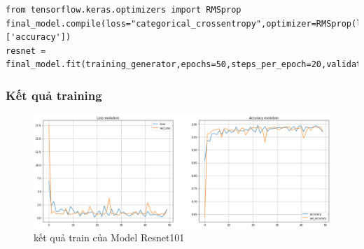 \begin{lstlisting}
from tensorflow.keras.optimizers import RMSprop
final_model.compile(loss="categorical_crossentropy",optimizer=RMSprop(lr=0.001),metrics=['accuracy'])
resnet = final_model.fit(training_generator,epochs=50,steps_per_epoch=20,validation_data=validation_generator)
\end{lstlisting}

\subsubsection{Kết quả training}
\begin{center}
    \begin{figure}[!h]
        \centering
        \includegraphics[scale = 0.4]{fileanh/38.png}
        \caption{kết quả train của Model Resnet101}
    \end{figure}
\end{center}
